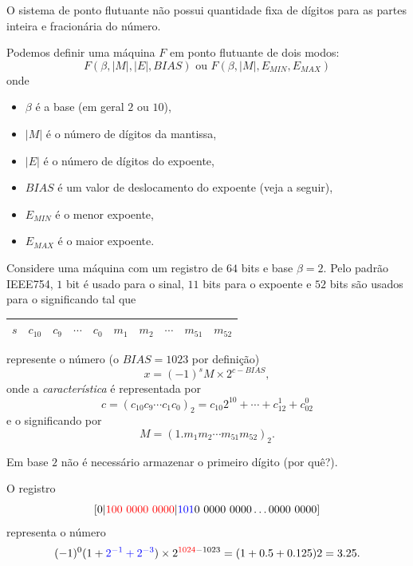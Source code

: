 O sistema de ponto flutuante não possui quantidade fixa de dígitos para as partes inteira e fracionária do número.

Podemos definir uma máquina $F$ em ponto flutuante de dois modos:
\begin{equation}  F(\beta,|M|,|E|,BIAS) \text{ ou } F(\beta,|M|,E_{MIN},E_{MAX}) \end{equation}
onde
\begin{itemize}
 \item $\beta$ é a base (em geral $2$ ou $10$),
 \item $|M|$ é o número de dígitos da mantissa,
 \item $|E|$ é o número de dígitos do expoente,
 \item $BIAS$ é um valor de deslocamento do expoente (veja a seguir),
 \item $E_{MIN}$ é o menor expoente,
 \item $E_{MAX}$ é o maior expoente.
\end{itemize}


Considere uma máquina com um registro de $64$ bits e base $\beta=2$. Pelo padrão IEEE754, $1$ bit é usado para o sinal, $11$ bits para o expoente e $52$ bits são usados para o significando tal que
\begin{center}
  \begin{tabular}{|c|c|c|c|c|c|c|c|c|c|}\hline
    $s$ & $c_{10}$ & $c_{9}$ & $\cdots$ & $c_{0}$ & $m_1$ & $m_2$ & $\cdots$ & $m_{51}$ & $m_{52}$\\\hline
  \end{tabular}
\end{center}
represente o número (o $BIAS=1023$ por definição)
\begin{equation}  x=(-1)^{s}M \times 2^{c-BIAS}, \end{equation}
onde a \emph{característica} é representada por
\begin{equation} c=(c_{10}c_9\cdots c_1c_0)_2=c_{10}2^{10}+\cdots+c_12^1+c_02^0  \end{equation}
e o significando por
\begin{equation} M=(1.m_1m_2\cdots m_{51}m_{52})_2. \end{equation}

\begin{obs}
  Em base $2$ não é necessário armazenar o primeiro dígito (por quê?).
\end{obs}

\begin{ex}
O registro
$$
[0|{\color{red}{100~0000~0000}} |{\color{blue}{101}}0~0000~0000\ldots 0000~0000]
$$
representa o número
$$
(-1)^0(1+{\color{blue}{2^{-1}+2^{-3}}})\times  2^{{\color{red}{1024}}-1023}=(1+0.5+0.125)2=3.25.
$$
\end{ex}

